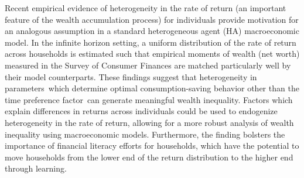 Recent empirical evidence of heterogeneity in the rate of return (an important feature of the wealth accumulation process) for individuals provide motivation for an analogous assumption in a standard heterogeneous agent (HA) macroeconomic model. In the infinite horizon setting, a uniform distribution of the rate of return across households is estimated such that empirical moments of wealth (net worth) measured in the Survey of Consumer Finances are matched particularly well by their model counterparts. These findings suggest that heterogeneity in parameters which determine optimal consumption-saving behavior other than the time preference factor can generate meaningful wealth inequality. Factors which explain differences in returns across individuals could be used to endogenize heterogeneity in the rate of return, allowing for a more robust analysis of wealth inequality using macroeconomic models. Furthermore, the finding bolsters the importance of financial literacy efforts for households, which have the potential to move households from the lower end of the return distribution to the higher end through learning.